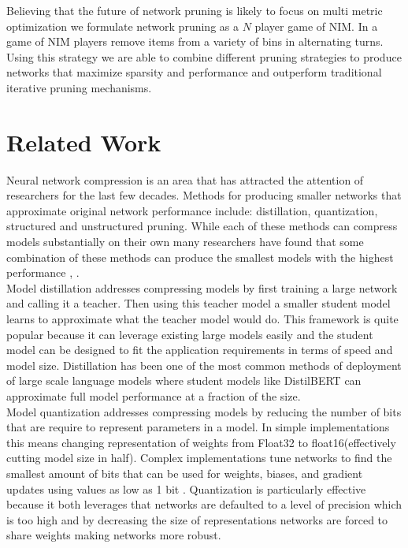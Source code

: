 \documentclass[runningheads]{llncs}
\begin{document}
Believing that the future of network pruning is likely to focus on multi metric optimization we formulate network pruning as a $N$ player game of NIM. In a game of NIM \cite{Dass2006SecretsBT} players remove items from a variety of bins in alternating turns. Using this strategy we are able to combine different pruning strategies to produce networks that maximize sparsity and performance and outperform traditional iterative pruning mechanisms. 
\section{Related Work}
Neural network compression is an area that has attracted the attention of researchers for the last few decades. Methods for producing smaller networks that approximate original network performance include: distillation, quantization, structured and unstructured pruning. While each of these methods can compress models substantially on their own many researchers have found that some combination of these methods can produce the smallest models with the highest performance \cite{Polino2018ModelCV}, \cite{Sanh2020MovementPA}. \\
Model distillation \cite{Ba2014DoDN} addresses compressing models by first training a large network and calling it a teacher. Then using this teacher model a smaller student model learns to approximate what the teacher model would do. This framework is quite popular because it can leverage existing large models easily and the student model can be designed to fit the application requirements in terms of speed and model size. Distillation has been one of the most common methods of deployment of large scale language models where student models like DistilBERT \cite{Sanh2019DistilBERTAD} can approximate full model performance at a fraction of the size. \\
Model quantization \cite{Gong2014CompressingDC} \cite{Han2016DeepCC} addresses compressing models by reducing the number of bits that are require to represent parameters in a model. In simple implementations this means changing representation of weights from Float32 to float16(effectively cutting model size in half). Complex implementations tune networks to find the smallest amount of bits that can be used for weights, biases, and gradient updates using values as low as 1 bit \cite{Courbariaux2016BinarizedNN}. Quantization is particularly effective because it both leverages that networks are defaulted to a level of precision which is too high and by decreasing the size of representations networks are forced to share weights making networks more robust. \\
\end{document}
